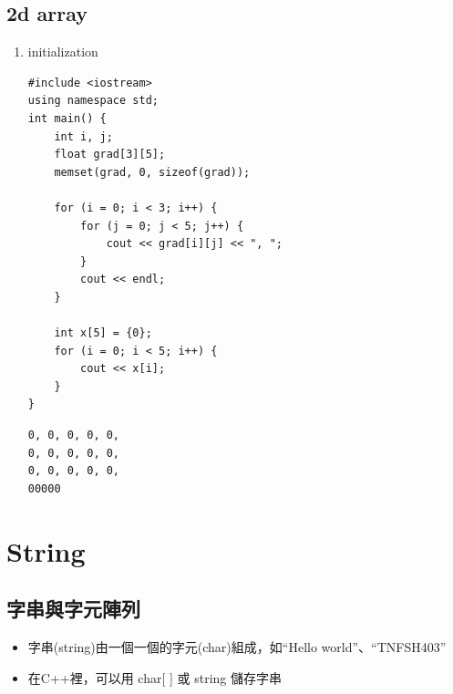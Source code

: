 \documentclass[a4paper,12pt]{article}
\begin{document}
\subsection{2d array}
\label{sec:org8439b8d}
\begin{enumerate}
\item initialization
\label{sec:org59b8a58}
\lstset{breaklines=true,language=cpp,label= ,caption= ,captionpos=b,firstnumber=1,numbers=left}
\begin{lstlisting}
#include <iostream>
using namespace std;
int main() {
    int i, j;
    float grad[3][5];
    memset(grad, 0, sizeof(grad));

    for (i = 0; i < 3; i++) {
        for (j = 0; j < 5; j++) {
            cout << grad[i][j] << ", ";
        }
        cout << endl;
    }

    int x[5] = {0};
    for (i = 0; i < 5; i++) {
        cout << x[i];
    }
}
\end{lstlisting}

\begin{verbatim}
0, 0, 0, 0, 0, 
0, 0, 0, 0, 0, 
0, 0, 0, 0, 0, 
00000
\end{verbatim}
\end{enumerate}

\section{String}
\label{cpp_string}
\subsection{字串與字元陣列}
\label{sec:org9dbb22a}
\begin{itemize}
\item 字串(string)由一個一個的字元(char)組成，如``Hello world''、``TNFSH403''\\
\item 在C++裡，可以用 char[ ] 或 string 儲存字串\\
\end{itemize}
\end{document}
